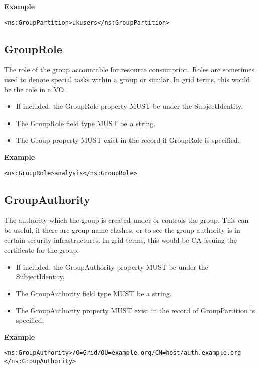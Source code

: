 {\bf Example}
\begin{verbatim}
<ns:GroupPartition>ukusers</ns:GroupPartition>
\end{verbatim}


\subsection{GroupRole}

The role of the group accountable for resource consumption. Roles are sometimes
used to denote special tasks within a group or similar. In grid terms, this
would be the role in a VO.

\begin{itemize}
\item If included, the GroupRole property MUST be under the SubjectIdentity.
\item The GroupRole field type MUST be a string.
\item The Group property MUST exist in the record if GroupRole is specified.
\end{itemize}

{\bf Example}
\begin{verbatim}
<ns:GroupRole>analysis</ns:GroupRole>
\end{verbatim}


\subsection{GroupAuthority}

The authority which the group is created under or controls the group. This can
be useful, if there are group name clashes, or to see the group authority is in
certain security infrastructures. In grid terms, this would be CA issuing the
certificate for the group.

\begin{itemize}
\item If included, the GroupAuthority property MUST be under the
SubjectIdentity.
\item The GroupAuthority field type MUST be a string.
\item The GroupAuthority property MUST exist in the record of GroupPartition
    is specified.
\end{itemize}

{\bf Example}
\begin{verbatim}
<ns:GroupAuthority>/O=Grid/OU=example.org/CN=host/auth.example.org
</ns:GroupAuthority>
\end{verbatim}


